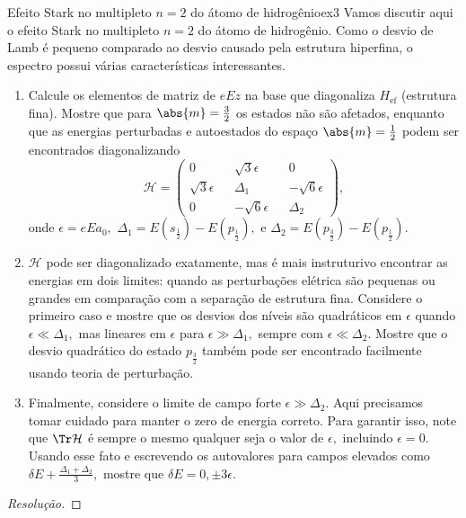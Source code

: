\begin{exercício}{Efeito Stark no multipleto \(n = 2\) do átomo de hidrogênio}{ex3}
   Vamos discutir aqui o efeito Stark no multipleto \(n = 2\) do átomo de hidrogênio. Como o desvio de Lamb é pequeno comparado ao desvio causado pela estrutura hiperfina, o espectro possui várias características interessantes.
   \begin{enumerate}[label=(\alph*)]
      \item Calcule os elementos de matriz de \(e E z\) na base que diagonaliza \(H_{\mathrm{ef}}\) (estrutura fina). Mostre que para \(\abs{m} = \frac32\) os estados não são afetados, enquanto que as energias perturbadas e autoestados do espaço \(\abs{m} = \frac12\) podem ser encontrados diagonalizando
         \begin{equation*}
            \mathcal{H} = \begin{pmatrix}
               0 && \sqrt{3} \epsilon && 0\\
               \sqrt{3} \epsilon && \Delta_1 && - \sqrt{6} \epsilon\\
               0 && - \sqrt{6} \epsilon && \Delta_2
            \end{pmatrix},
         \end{equation*}
         onde \(\epsilon = e E a_0,\) \(\Delta_1 = E(s_{\frac12}) - E(p_{\frac12}),\) e \(\Delta_2 = E(p_{\frac32}) - E(p_{\frac12}).\)
      \item \(\mathcal{H}\) pode ser diagonalizado exatamente, mas é mais instruturivo encontrar as energias em dois limites: quando as perturbações elétrica são pequenas ou grandes em comparação com a separação de estrutura fina. Considere o primeiro caso e mostre que os desvios dos níveis são quadráticos em \(\epsilon\) quando \(\epsilon \ll \Delta_1,\) mas lineares em \(\epsilon\) para \(\epsilon \gg \Delta_1,\) sempre com \(\epsilon \ll \Delta_2.\) Mostre que o desvio quadrático do estado \(p_{\frac32}\) também pode ser encontrado facilmente usando teoria de perturbação.
      \item Finalmente, considere o limite de campo forte \(\epsilon \gg \Delta_2.\) Aqui precisamos tomar cuidado para manter o zero de energia correto. Para garantir isso, note que \(\Tr\mathcal{H}\) é sempre o mesmo qualquer seja o valor de \(\epsilon,\) incluindo \(\epsilon = 0.\) Usando esse fato e escrevendo os autovalores para campos elevados como \(\delta E + \frac{\Delta_1 + \Delta_2}{3},\) mostre que \(\delta E = 0, \pm 3\epsilon.\)
   \end{enumerate}
\end{exercício}
\begin{proof}[Resolução]

\end{proof}
